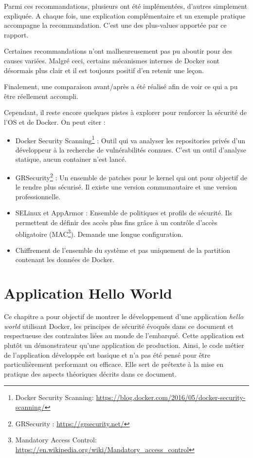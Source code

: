 \documentclass[11pt,a4paper,oneside]{report}
\begin{document}
Parmi ces recommandations, plusieurs ont été implémentées, d'autres simplement expliquée. A chaque fois, une explication complémentaire et un exemple pratique accompagne la recommandation. C'est une des plus-values apportée par ce rapport.

Certaines recommandations n'ont malheureusement pas pu aboutir pour des causes variées. Malgré ceci, certains mécanismes internes de Docker sont désormais plus clair et il est toujours positif d'en retenir une leçon.

Finalement, une comparaison avant/après a été réalisé afin de voir ce qui a pu être réellement accompli.

Cependant, il reste encore quelques pistes à explorer pour renforcer la sécurité de l'OS et de Docker. On peut citer :
\begin{itemize}
\item Docker Security Scanning\footnote{Docker Security Scanning: \url{https://blog.docker.com/2016/05/docker-security-scanning/}} : Outil qui va analyser les repositories privés d'un développeur à la recherche de vulnérabilités connues. C'est un outil d'analyse statique, aucun container n'est lancé.
\item GRSecurity\footnote{GRSecurity : \url{https://grsecurity.net/}} : Un ensemble de patches pour le kernel qui ont pour objectif de le rendre plus sécurisé. Il existe une version communautaire et une version professionnelle.
\item SELinux et AppArmor : Ensemble de politiques et profils de sécurité. Ils permettent de définir des accès plus fins grâce à un contrôle d'accès obligatoire (MAC\footnote{Mandatory Access Control: \url{https://en.wikipedia.org/wiki/Mandatory_access_control}}). Demande une longue configuration.
\item Chiffrement de l'ensemble du système et pas uniquement de la partition contenant les données de Docker.
\end{itemize}


\chapter{Application Hello World}\label{chp-app-hello-world}
Ce chapitre a pour objectif de montrer le développement d'une application \textit{hello world} utilisant Docker, les principes de sécurité évoqués dans ce document et respectueuse des contraintes liées au monde de l'embarqué. Cette application est plutôt un démonstrateur qu'une application de production. Ainsi, le code métier de l'application développée est basique et n'a pas été pensé pour être particulièrement performant ou efficace. Elle sert de prétexte à la mise en pratique des aspects théoriques décrits dans ce document.
\end{document}
